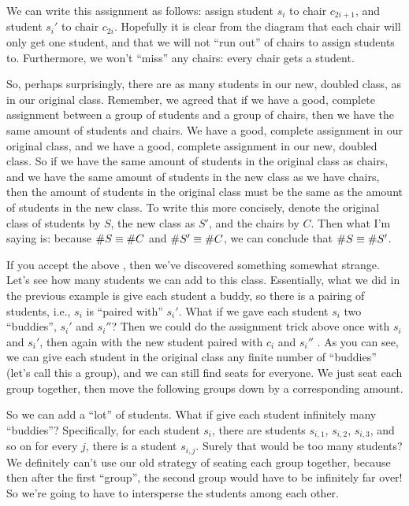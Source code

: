 We can write this assignment as follows: assign student $s_i$ to chair $c_{2i+1}$, and student $s_i'$ to chair $c_{2i}$.
Hopefully it is clear from the diagram that each chair will only get one student, and that we will not ``run out'' of chairs to assign students to.
Furthermore, we won't ``miss'' any chairs: every chair gets a student.

So, perhaps surprisingly, there are as many students in our new, doubled class, as in our original class.
Remember, we agreed that if we have a good, complete assignment between a group of students and a group of chairs, then we have the same amount of students and chairs.
We have a good, complete assignment in our original class, and we have a good, complete assignment in our new, doubled class.
So if we have the same amount of students in the original class as chairs, and we have the same amount of students in the new class as we have chairs, then the amount of students in the original class must be the same as the amount of students in the new class.
To write this more concisely, denote the original class of students by $S$, the new class as $S'$, and the chairs by $C$.
Then what I'm saying is: because $\# S \equiv \# C$ and $\# S' \equiv \# C$, we can conclude that $\# S \equiv \# S'$.

If you accept the above , then we've discovered something somewhat strange.
Let's see how many students we can add to this class.
Essentially, what we did in the previous example is give each student a buddy, so there is a pairing of students, i.e., $s_i$ is ``paired with'' $s_i'$.
What if we gave each student $s_i$ two ``buddies'', $s_i'$ and $s_i''$?
Then we could do the assignment trick above once with $s_i$ and $s_i'$, then again with the new student paired with $c_i$ and $s_i''$ .
As you can see, we can give each student in the original class any finite number of ``buddies'' (let's call this a group), and we can still find seats for everyone.
We just seat each group together, then move the following groups down by a corresponding amount.

So we can add a ``lot'' of students.
What if give each student infinitely many ``buddies''?
Specifically, for each student $s_i$, there are students $s_{i,1}$, $s_{i,2}$, $s_{i,3}$, and so on for every  $j$, there is a student $s_{i,j}$.
Surely that would be too many students?
We definitely can't use our old strategy of seating each group together, because then after the first ``group'', the second group would have to be infinitely far over!
So we're going to have to intersperse the students among each other.

